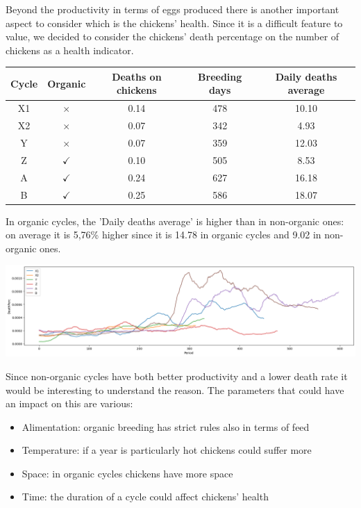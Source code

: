 \documentclass[11pt]{article}
\begin{document}
Beyond the productivity in terms of eggs produced there is another important aspect to consider which is the chickens' health. Since it is a difficult feature to value,
we decided to consider the chickens' death percentage on the number of chickens as a health indicator.

\begin{center}
    \begin{tabular}{| c | c | c | c | c |}
        \hline
        Cycle & Organic      & Deaths on chickens & Breeding days & Daily deaths average \\ [0.5ex]
        \hline
        X1    & $\times$     & 0.14               & 478           & 10.10                \\ [0.5ex]
        \hline
        X2    & $\times$     & 0.07               & 342           & 4.93                 \\ [0.5ex]
        \hline
        Y     & $\times$     & 0.07               & 359           & 12.03                \\ [0.5ex]
        \hline
        Z     & $\checkmark$ & 0.10               & 505           & 8.53                 \\ [0.5ex]
        \hline
        A     & $\checkmark$ & 0.24               & 627           & 16.18                \\ [0.5ex]
        \hline
        B     & $\checkmark$ & 0.25               & 586           & 18.07                \\ [0.5ex]
        \hline
    \end{tabular}
\end{center}

In organic cycles, the 'Daily deaths average' is higher than in non-organic ones: on average it is 5,76\% higher since it is 14.78 in organic cycles and 9.02 in non-organic ones.

\includegraphics[width=\linewidth]{../Results/OrganingOrNot/DeathPerc.png}

Since non-organic cycles have both better productivity and a lower death rate it would be interesting to understand the reason. The parameters that could have an impact on this are various:
\begin{itemize}
    \item Alimentation: organic breeding has strict rules also in terms of feed
    \item Temperature: if a year is particularly hot chickens could suffer more
    \item Space: in organic cycles chickens have more space
    \item Time: the duration of a cycle could affect chickens' health
\end{itemize}
\end{document}
